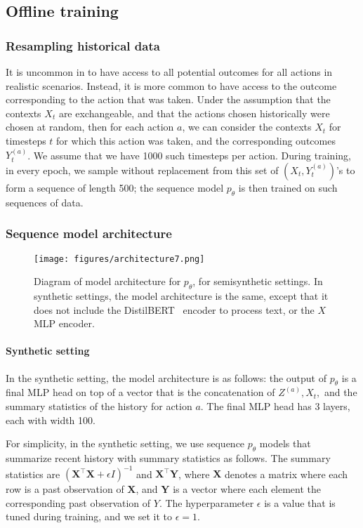 \subsection{Offline training}
\subsubsection{Resampling historical data}
\label{app:pretrain_bootstrap}
It is uncommon in to have access to all potential outcomes for all actions in realistic scenarios. 
Instead, it is more common to have access to the outcome corresponding to the action that was taken. Under the assumption that the contexts $X_t$ are exchangeable, and that the actions chosen historically were chosen at random, then for each action $a$, we can consider the contexts $X_t$ for timesteps $t$ for which this action was taken, and the corresponding outcomes $Y^{(a)}_t$. 
We assume that we have 1000 such timesteps per action. 
During training, in every epoch, we sample without replacement from this set of $(X_t, Y_t^{(a)})$'s to form a sequence of length 500; the sequence model $p_\theta$ is then trained on such sequences of data. 



\subsubsection{Sequence model architecture}
\label{app:sequence_models}
\begin{figure}[h]
\centering
\texttt{[image: figures/architecture7.png]}    
\caption{Diagram of model architecture for $p_\theta$, for semisynthetic settings. In synthetic settings, the model architecture is the same, except that it does not include the DistilBERT~\cite{sanh2019distilbert} encoder to process text, or the $X$ MLP encoder. }
\label{fig:architecture}
\end{figure}

\paragraph{Synthetic setting} In the synthetic setting, the model architecture is as follows: the output of $p_\theta$ is a final MLP head on top of a vector that is the concatenation of $Z^{(a)},X_t,$ and the summary statistics of the history for action $a$. The final MLP head has 3 layers, each with width 100. 

For simplicity, in the synthetic setting, we use sequence $p_\theta$ models that summarize recent history with summary statistics as follows. The summary statistics are $(\mathbf{X}^\top \mathbf{X}+\epsilon I)^{-1}$ and $\mathbf{X}^\top \mathbf{Y}$, where $\mathbf{X}$ denotes a matrix where each row is a past observation of $\mathbf{X}$, and $\mathbf{Y}$ is a vector where each element the corresponding past observation of $Y$. The hyperparameter $\epsilon$ is a value that is tuned during training, and we set it to $\epsilon=1$. 


